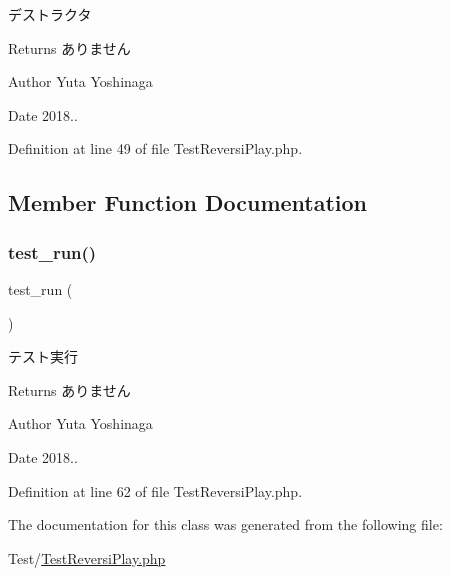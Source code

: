デストラクタ 

\begin{DoxyReturn}{Returns}
ありません 
\end{DoxyReturn}
\begin{DoxyAuthor}{Author}
Yuta Yoshinaga 
\end{DoxyAuthor}
\begin{DoxyDate}{Date}
2018.. 
\end{DoxyDate}


Definition at line 49 of file Test\+Reversi\+Play.\+php.



\subsection{Member Function Documentation}
\mbox{\label{class_test_reversi_play_a9b029832cfdf19c0ef36b1f5ef7b7735}} 
\subsubsection{\texorpdfstring{test\+\_\+run()}{test\_run()}}
{\footnotesize\ttfamily test\+\_\+run (\begin{DoxyParamCaption}{ }\end{DoxyParamCaption})}



テスト実行 

\begin{DoxyReturn}{Returns}
ありません 
\end{DoxyReturn}
\begin{DoxyAuthor}{Author}
Yuta Yoshinaga 
\end{DoxyAuthor}
\begin{DoxyDate}{Date}
2018.. 
\end{DoxyDate}


Definition at line 62 of file Test\+Reversi\+Play.\+php.



The documentation for this class was generated from the following file\+:\begin{DoxyCompactItemize}
\item 
Test/\hyperlink{_test_reversi_play_8php}{Test\+Reversi\+Play.\+php}\end{DoxyCompactItemize}
